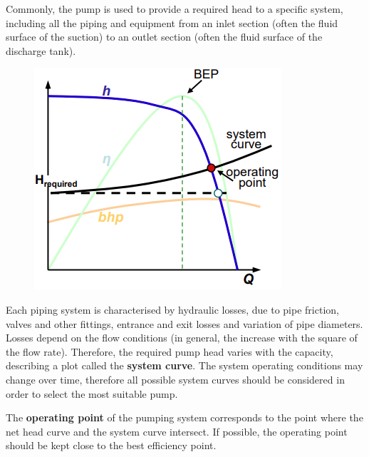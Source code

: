 \documentclass[class=report, crop=false, 12pt,a4paper]{standalone}
\begin{document}
Commonly, the pump is used  to provide a required head to a specific system, including all the piping and equipment from an inlet section (often the fluid surface of the suction) to an outlet section (often the fluid surface of the discharge tank). 
\begin{figure}[H]
  \centering
  \includegraphics[width = 0.6 \textwidth]{../img/BEPgraph2.png}
\end{figure}
Each piping system is characterised by hydraulic losses, due to pipe friction, valves and other fittings, entrance and exit losses and variation of pipe diameters. Losses depend on the flow conditions (in general, the increase with the square of the flow rate). Therefore, the required pump head varies with the capacity, describing a plot called the \textbf{system curve}. The system operating conditions may change over time, therefore all possible system curves should be considered in order to select the most suitable pump.

The \textbf{operating point} of the pumping system corresponds to the point where the net head curve and the system curve intersect. If possible, the operating point should be kept close to the best efficiency point.
\end{document}

